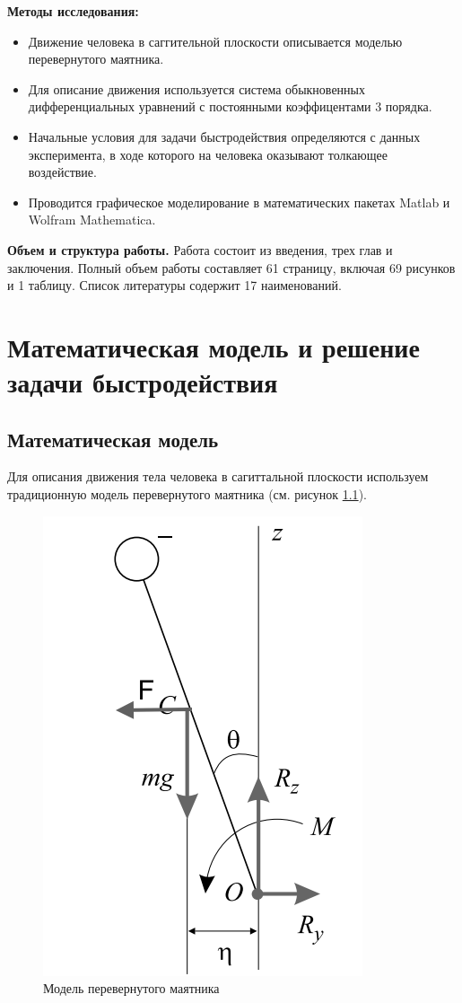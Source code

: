 \documentclass[a4paper,12pt, openany]{book}
\theoremstyle{plain} %
\theoremstyle{definition} %
\theoremstyle{remark} %
\numberwithin{equation}{chapter}
\begin{document}
{\textbf{Методы исследования:}
\begin{itemize}
    \item Движение человека в саггительной плоскости описывается моделью перевернутого маятника.
    \item Для описание движения используется система обыкновенных дифференциальных уравнений с постоянными коэффицентами 3 порядка.
    \item Начальные условия для задачи быстродействия определяются с данных эксперимента, в ходе которого на человека оказывают толкающее воздействие.
    \item Проводится графическое моделирование в математических пакетах Matlab и Wolfram Mathematica.
\end{itemize}




\textbf{Объем и структура работы.} Работа состоит из введения, трех глав и заключения. Полный объем работы составляет 61 страницу, включая 69 рисунков и 1 таблицу. Список литературы содержит 17 наименований.

\newpage

\chapter{Математическая модель и решение задачи быстродействия}
\section{Математическая модель}
Для описания движения тела человека в сагиттальной плоскости используем традиционную модель перевернутого маятника (см. рисунок \ref{fig:pendulum}).

\begin{figure}[h!]
    \centering
    \includegraphics[width=0.4\linewidth]{body_1.png}
    \caption{Модель перевернутого маятника}
    \label{fig:pendulum}
\end{figure}

}
\end{document}
